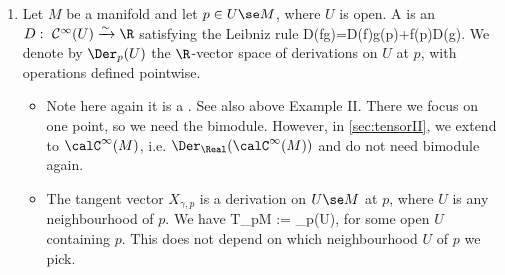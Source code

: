 \documentclass{article}
\newcommand{\cl}{:\text{ }}
\begin{document}
\begin{enumerate}
\item {} 
Let $M$ be a manifold and let $p\in U \se M$, where $U$ is open. A  is an  $D\cl \mathcal{C}^\infty(U)\xrightarrow{\sim}\R$ satisfying the Leibniz rule
\bse
D(fg)=D(f)g(p)+f(p)D(g).
\ese
We denote by $\Der_p(U)$ the $\R$-vector space of derivations on $U$ at $p$, with operations defined pointwise.
\begin{itemize}
    \item Note here again it is a . See also above Example II. There we focus on one point, so we need the bimodule. However, in \cref{sec:tensorII}, we extend to $\calC^\infty(M)$, i.e.  $\Der_{\Real}(\calC^\infty(M))$ and do not need bimodule again.
    \item {} The tangent vector $X_{\gamma,p}$ is a derivation on $U\se M$ at $p$, where $U$ is any neighbourhood of $p$. We have
\bse
T_pM := \Der_p(U),
\ese
for some open $U$ containing $p$. This does not depend on which neighbourhood $U$ of $p$ we pick.
\end{itemize}



\end{enumerate}
\end{document}
